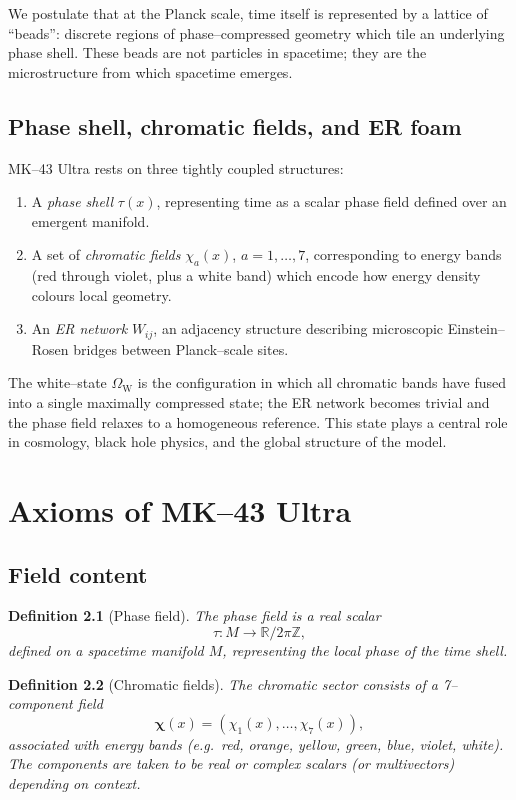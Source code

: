 \documentclass[11pt]{book}
\newtheorem{definition}{Definition}[chapter]
\newcommand{\Wcore}{\Omega_{\mathrm{W}}}
\begin{document}
We postulate that at the Planck scale, time itself is represented by a lattice of ``beads'':
discrete regions of phase--compressed geometry which tile an underlying phase shell.
These beads are not particles in spacetime; they are the microstructure from which spacetime emerges.

\section{Phase shell, chromatic fields, and ER foam}

MK--43 Ultra rests on three tightly coupled structures:
\begin{enumerate}[label=(\alph*)]
  \item A \emph{phase shell} $\tau(x)$, representing time as a scalar phase field defined over an emergent manifold.
  \item A set of \emph{chromatic fields} $\chi_a(x)$, $a=1,\dots,7$, corresponding to energy bands (red through violet, plus a white band) which encode how energy density colours local geometry.
  \item An \emph{ER network} $W_{ij}$, an adjacency structure describing microscopic Einstein--Rosen bridges between Planck--scale sites.
\end{enumerate}

The white--state $\Wcore$ is the configuration in which all chromatic bands have fused into a single maximally compressed state; the ER network becomes trivial and the phase field relaxes to a homogeneous reference.
This state plays a central role in cosmology, black hole physics, and the global structure of the model.

\chapter{Axioms of MK--43 Ultra}

\section{Field content}

\begin{definition}[Phase field]
The phase field is a real scalar
\[
  \tau : M \to \mathbb{R}/2\pi\mathbb{Z},
\]
defined on a spacetime manifold $M$, representing the local phase of the time shell.
\end{definition}

\begin{definition}[Chromatic fields]
The chromatic sector consists of a 7--component field
\[
  \bm{\chi}(x) = (\chi_1(x),\dots,\chi_7(x)),
\]
associated with energy bands (e.g.\ red, orange, yellow, green, blue, violet, white).
The components are taken to be real or complex scalars (or multivectors) depending on context.
\end{definition}
\end{document}

